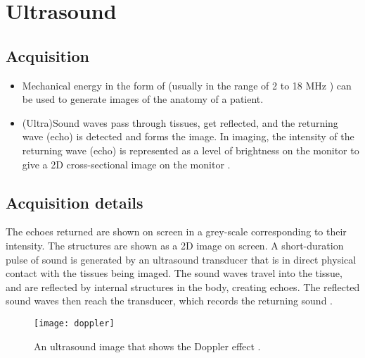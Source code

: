 \chapter{Ultrasound}

\section{Acquisition}
\begin{itemize}
  
\item Mechanical energy in the form of  (usually in the range of 2 to 18 MHz
  \cite{abdulla2025sound})  can be
  used to generate images of the anatomy of a patient.

\item (Ultra)Sound waves pass through tissues, get reflected, and the
  returning wave (echo) is detected and forms the image. In
   imaging, the intensity of the returning wave (echo)
  is represented as a level of brightness on the monitor to give a 2D
  cross-sectional image on the monitor \cite{abdulla2025ultrasound}.

\end{itemize}

\section{Acquisition details}
The echoes returned are shown on screen in a grey-scale corresponding
to their intensity. The structures are shown as a 2D image on
screen. A short-duration pulse of sound is generated by an ultrasound
transducer that is in direct physical contact with the tissues being
imaged. The sound waves travel into the tissue, and are reflected by
internal structures in the body, creating echoes. The reflected sound
waves then reach the transducer, which records the returning sound
\cite{bushberg2011essential,abdulla2025ultrasound_machine}.

\begin{figure}
  \centering
  \texttt{[image: doppler]}
  \caption{An ultrasound image that shows the Doppler effect
    \cite{abdulla2025ultrasound_imaging_doppler}.\label{fig:doppler}}
\end{figure}


